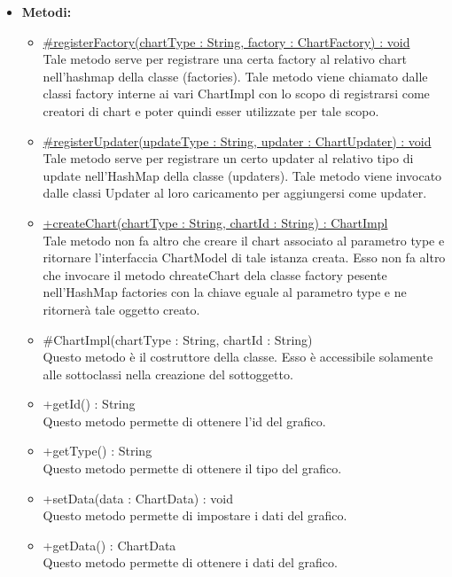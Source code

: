 \begin{itemize}
			\item \textbf{Metodi:}
				\begin{itemize}
				\setlength{\itemsep}{5pt}
				
					\item[\ding{111}] {\underline{\#registerFactory(chartType : String, factory : ChartFactory) : void}} \\ [1mm] Tale metodo serve per registrare una certa factory al relativo chart nell’hashmap della classe (factories). Tale metodo viene chiamato dalle classi factory interne ai vari ChartImpl con lo scopo di registrarsi come creatori di chart e poter quindi esser utilizzate per tale scopo.
					\item[\ding{111}] {\underline{\#registerUpdater(updateType : String, updater : ChartUpdater) : void}} \\ [1mm] Tale metodo serve per registrare un certo updater al relativo tipo di update nell’HashMap della classe (updaters). Tale metodo viene invocato dalle classi Updater al loro caricamento per aggiungersi come updater.
					\item[\ding{111}] {\underline{+createChart(chartType : String, chartId : String) : ChartImpl}} \\ [1mm] Tale metodo non fa altro che creare il chart associato al parametro type e ritornare l’interfaccia ChartModel di tale istanza creata. Esso non fa altro che invocare il metodo chreateChart dela classe factory pesente nell’HashMap factories con la chiave eguale al parametro type e ne ritornerà tale oggetto creato.
					\item[\ding{111}] {{\#ChartImpl(chartType : String, chartId : String)}} \\ [1mm] Questo metodo è il costruttore della classe. Esso è accessibile solamente alle sottoclassi nella creazione del sottoggetto.
					\item[\ding{111}] {{+getId() : String}} \\ [1mm] Questo metodo permette di ottenere l'id del grafico.
					\item[\ding{111}] {{+getType() : String}} \\ [1mm] Questo metodo permette di ottenere il tipo del grafico.
					\item[\ding{111}] {{+setData(data : ChartData) : void}} \\ [1mm] Questo metodo permette di impostare i dati del grafico.
					\item[\ding{111}] {{+getData() : ChartData}} \\ [1mm] Questo metodo permette di ottenere i dati del grafico.

\end{itemize}
\end{itemize}
